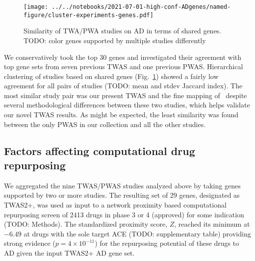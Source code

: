 \documentclass[letterpaper]{article}
\begin{document}
\begin{figure}
\texttt{[image: ../../notebooks/2021-07-01-high-conf-ADgenes/named-figure/cluster-experiments-genes.pdf]}
\caption{
Similarity of TWA/PWA studies on AD in terms of shared genes.
  TODO: color genes supported by multiple studies differently
}
\label{fig:twas-clustermap}
\end{figure}

We conservatively took the top 30 genes and investigated their agreement with
top gene sets from seven previous TWAS and one previous PWAS.  Hierarchical
clustering of studies based on shared genes (Fig.~\ref{fig:twas-clustermap})
showed a fairly low agreement for all pairs of studies (TODO: mean and stdev
Jaccard index).  The most similar study pair was our present TWAS and the fine
mapping of~\cite{Jansen2019} despite several methodological differences
between these two studies, which helps validate our novel TWAS results.  As
might be expected, the least similarity was found between the only PWAS in our
collection and all the other studies.

\subsection{Factors affecting computational drug repurposing}

We aggregated the nine TWAS/PWAS studies analyzed above by taking genes
supported by two or more studies.  The resulting set of 29 genes, designated
as TWAS2+, was used as input to a network proximity based computational
repurposing screen of 2413 drugs in phase 3 or 4 (approved) for some
indication (TODO: Methods).  The standardized proximity score, $Z$, reached
its minimum at $-6.49$ at drugs with the sole target ACE (TODO: supplementary
table) providing strong evidence ($p=4\times 10^{-11}$) for the repurposing
potential of these drugs to AD given the input TWAS2+ AD gene set.
\end{document}
